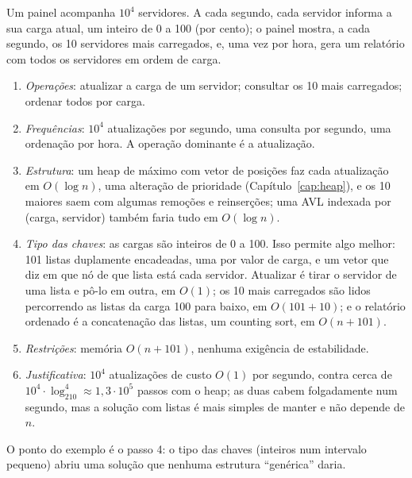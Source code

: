 \begin{exemplo}\label{ex:painel}
Um painel acompanha $10^4$ servidores. A cada segundo, cada servidor informa a sua carga atual, um inteiro de 0 a 100 (por cento); o painel mostra, a cada segundo, os 10 servidores mais carregados, e, uma vez por hora, gera um relatório com todos os servidores em ordem de carga.
\begin{enumerate}
  \item \emph{Operações}: atualizar a carga de um servidor; consultar os 10 mais carregados; ordenar todos por carga.
  \item \emph{Frequências}: $10^4$ atualizações por segundo, uma consulta por segundo, uma ordenação por hora. A operação dominante é a atualização.
  \item \emph{Estrutura}: um heap de máximo com vetor de posições faz cada atualização em $O(\log n)$, uma alteração de prioridade (Capítulo~\ref{cap:heap}), e os 10 maiores saem com algumas remoções e reinserções; uma AVL indexada por (carga, servidor) também faria tudo em $O(\log n)$.
  \item \emph{Tipo das chaves}: as cargas são inteiros de 0 a 100. Isso permite algo melhor: 101 listas duplamente encadeadas, uma por valor de carga, e um vetor que diz em que nó de que lista está cada servidor. Atualizar é tirar o servidor de uma lista e pô-lo em outra, em $O(1)$; os 10 mais carregados são lidos percorrendo as listas da carga 100 para baixo, em $O(101+10)$; e o relatório ordenado é a concatenação das listas, um counting sort, em $O(n+101)$.
  \item \emph{Restrições}: memória $O(n+101)$, nenhuma exigência de estabilidade.
  \item \emph{Justificativa}: $10^4$ atualizações de custo $O(1)$ por segundo, contra cerca de $10^4\cdot\log_210^4\approx1{,}3\cdot10^5$ passos com o heap; as duas cabem folgadamente num segundo, mas a solução com listas é mais simples de manter e não depende de $n$.
\end{enumerate}
O ponto do exemplo é o passo 4: o tipo das chaves (inteiros num intervalo pequeno) abriu uma solução que nenhuma estrutura ``genérica'' daria.
\end{exemplo}


